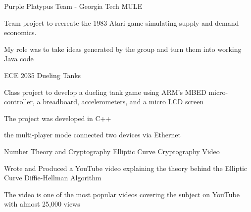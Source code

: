 \begin{cventries}
  \cventry
    {Purple Platypus Team - Georgia Tech} %
    {MULE} %
    {} %
    {} %
    {
      \begin{cvitems} %
        \item {Team project to recreate the 1983 Atari game simulating supply and demand economics.}
        \item {My role was to take ideas generated by the group and turn them into working Java code}
      \end{cvitems}
    }
    
    \cventry
    {ECE 2035} %
    {Dueling Tanks} %
    {} %
    {} %
    {
      \begin{cvitems} %
        \item {Class project to develop a dueling tank game using ARM's MBED micro-controller, a breadboard, accelerometers, and a micro LCD screen}
        \item {The project was developed in C++}
        \item {the multi-player mode connected two devices via Ethernet}
      \end{cvitems}
    }
    
    \cventry
    {Number Theory and Cryptography} %
    {Elliptic Curve Cryptography Video} %
    {} %
    {} %
    {
      \begin{cvitems} %
        \item {Wrote and Produced a YouTube video explaining the theory behind the Elliptic Curve Diffie-Hellman Algorithm}
        \item {The video is one of the most popular videos covering the subject on YouTube with almost 25,000 views}
      \end{cvitems}
    }

\end{cventries}
